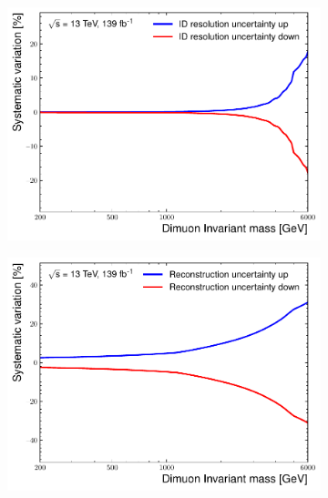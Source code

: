 \begin{figure}[]
\begin{subfigure}[b]{0.42\textwidth}
        \caption{}
        \label{fig:uncert:mmMC}
    \end{subfigure}
    \begin{subfigure}[b]{0.42\textwidth}
        \centering
        \includegraphics[width=\textwidth]{figures/analysis/datamc/Uncertainties/exp/mm/m_uu_pstOR_MUON_ID__1up.pdf}
        \caption{}
        \label{fig:uncert:mmID}
    \end{subfigure}
    \begin{subfigure}[b]{0.42\textwidth}
        \centering
        \includegraphics[width=\textwidth]{figures/analysis/datamc/Uncertainties/exp/mm/m_uu_pstOR_MUON_EFF_RECO_SYS__1up.pdf}

\end{subfigure}
\end{figure}
